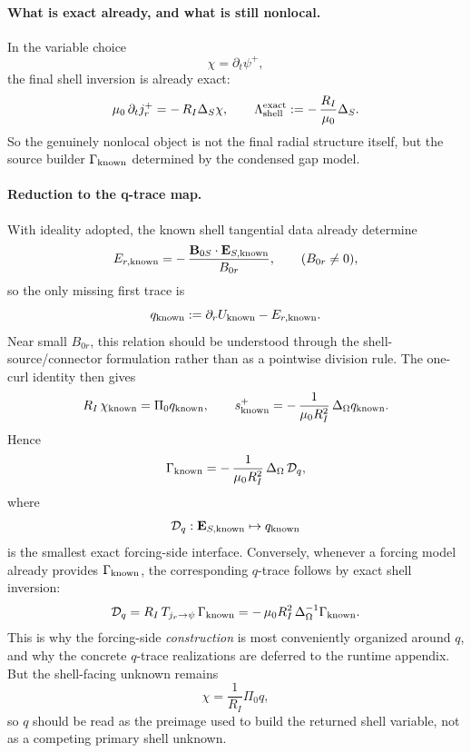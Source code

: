 \documentclass[11pt,a4paper]{article}
\begin{document}
\paragraph{What is exact already, and what is still nonlocal.}
In the variable choice
\[
\chi=\partial_t\psi^+,
\]
the final shell inversion is already exact:
\[
\mu_0\,\partial_t j_r^+ = -\,R_I\Delta_S\chi,
\qquad
\Lambda_{\rm shell}^{\rm exact}:= -\,\frac{R_I}{\mu_0}\Delta_S.
\label{eq:exact_shell_radial_structure_operator}
\]
So the genuinely nonlocal object is not the final radial structure itself, but
the source builder \(\Gamma_{\rm known}\) determined by the condensed gap
model.

\paragraph{Reduction to the q-trace map.}
With ideality adopted, the known shell tangential data already determine
\[
E_{r,\rm known}
=
-\,\frac{\mathbf B_{0S}\cdot \mathbf E_{S,\rm known}}{B_{0r}},
\qquad
(B_{0r}\neq 0),
\]
so the only missing first trace is
\[
q_{\rm known}:=\partial_r U_{\rm known}-E_{r,\rm known}.
\]
Near small \(B_{0r}\), this relation should be understood through the
shell-source/connector formulation rather than as a pointwise division rule.
The one-curl identity then gives
\begin{equation}
R_I\,\chi_{\rm known} = \Pi_0 q_{\rm known},
\qquad
s_{\rm known}^+
=
-\,\frac{1}{\mu_0 R_I^2}\,\Delta_\Omega q_{\rm known}.
\label{eq:gamma_known_from_q}
\end{equation}
Hence
\begin{equation}
\Gamma_{\rm known}
=
-\,\frac{1}{\mu_0 R_I^2}\,\Delta_\Omega\,\mathcal D_q,
\label{eq:gamma_known_via_dtn_q}
\end{equation}
where
\[
\mathcal D_q:\mathbf E_{S,\rm known}\mapsto q_{\rm known}
\]
is the smallest exact forcing-side interface. Conversely, whenever a forcing
model already provides \(\Gamma_{\rm known}\), the corresponding \(q\)-trace
follows by exact shell inversion:
\begin{equation}
\mathcal D_q
=
R_I\,T_{j_r\to\psi}\,\Gamma_{\rm known}
=
-\,\mu_0 R_I^2\,\Delta_\Omega^{-1}\Gamma_{\rm known}.
\label{eq:Dq_from_source_operator}
\end{equation}
This is why the forcing-side \emph{construction} is most conveniently organized
around \(q\), and why the concrete \(q\)-trace realizations are deferred to
the runtime appendix. But the shell-facing unknown remains
\[
\chi=\frac{1}{R_I}\Pi_0 q,
\]
so \(q\) should be read as the preimage used to build the returned shell
variable, not as a competing primary shell unknown.
\end{document}
